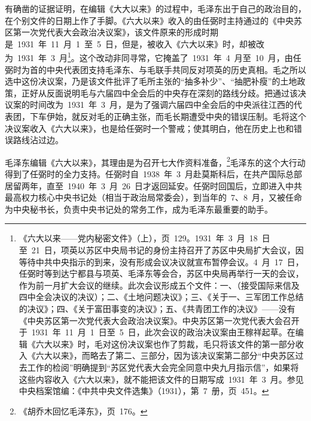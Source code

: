 有确凿的证据证明，在编辑《大大以来》的过程中，毛泽东出于自己的政治目的，在个别文件的日期上作了手脚。《六大以来》收入的由任弼时主持通过的《中央苏区第一次党代表大会政治决议案》，该文件原来的形成时期是~1931~年~11~月~1~至~5~日，但是，被收入《六大以来》时，却被改为~1931~年~3~月\footnote{《六大以来——党内秘密文件》（上），页~129。1931~年~3~月~18~日至~21~日，项英以苏区中央局书记的身份主持召开了苏区中央局扩大会议，因等待中共中央指示的到来，没有形成会议决议就宣布暂停会议。4~月~17~日，任弼时等到达宁都县与项英、毛泽东等会合，苏区中央局再举行一天的会议，作为前一月扩大会议的继续。此次会议形成五个文件：一、（接受国际来信及四中全会决议的决议）；二、《土地问题决议》；三、《关于一、三军团工作总结的决议》；四、《关于富田事变的决议》；五、《共青团工作的决议》——没有《中央苏区第一次党代表大会政治决议案》。中央苏区第一次党代表大会召开于~1931~年~11~月~1~日至~5~日，此次会议的政治决议案由王稼祥起草。在编辑《六大以来》时，毛对这份决议案也作了剪裁，毛只将该文件的第一部分收入《六大以来》，而略去了第二、三部分，因为该决议案第二部分“中央苏区过去工作的检阅”明确提到“苏区党代表大会完全同意中央九月指示信”，如果将这些内容收入《六大以来》，就不能把该文件的日期写成~1931~年~3~月。参见中央档案馆编：《中共中央文件选集》（1931），第~7~册，页~451。}。这个改动非同寻常，它掩盖了~1931~年~4~月至~10~月，由任弼时为首的中央代表团支持毛泽东、与毛联手共同反对项英的历史真相。毛之所以选中这份决议案，乃是该文件批评了毛所主张的“抽多补少”、“抽肥补瘦”的土地政策，正好从反面说明毛与六届四中全会后的中央存在深刻的路线分歧。把通过该决议案的时间改为~1931~年~3~月，是为了强调六届四中全会后的中央派往江西的代表团，下车伊始，就反对毛的正确主张，而毛长期遭受中央的错误压制。毛将这个决议案收入《六大以来》，也是给任弼时一个警戒；使其明白，他在历史上也和错误路线沾过边。

毛泽东编辑《六大以来》，其理由是为召开七大作资料准备，\footnote{《胡乔木回忆毛泽东》，页~176。}毛泽东的这个大行动得到了任弼时的全力支持。任弼时自~1938~年~3~月赴莫斯科后，在共产国际总部居留两年，直至~1940~年~3~月~26~日才返回延安。任弼时回国后，立即进入中共最高权力核心中央书记处（相当于政治局常委会），到当年的~7、8~月，又被任命为中央秘书长，负责中央书记处的常务工作，成为毛泽东最重要的助手。

